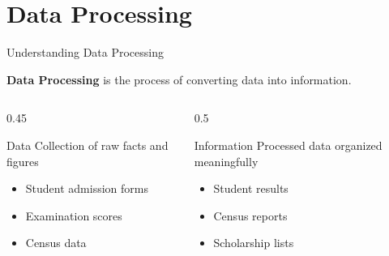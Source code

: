 \documentclass[aspectratio=169]{beamer}
\begin{document}
\section{Data Processing}

\begin{frame}{Understanding Data Processing}
    \begin{definition}
        \textbf{Data Processing} is the process of converting data into information.
    \end{definition}
    
    \vspace{0.5cm}
    \begin{columns}
        \begin{column}{0.45\textwidth}
            \begin{block}{Data}
                Collection of raw facts and figures
                \begin{itemize}
                    \item Student admission forms
                    \item Examination scores
                    \item Census data
                \end{itemize}
            \end{block}
        \end{column}
        \begin{column}{0.5\textwidth}
            \begin{block}{Information}
                Processed data organized meaningfully
                \begin{itemize}
                    \item Student results
                    \item Census reports
                    \item Scholarship lists
                \end{itemize}
            \end{block}
        \end{column}
    \end{columns}
    
    \vspace{0.5cm}
    \begin{center}
    \end{center}
\end{frame}
\end{document}

